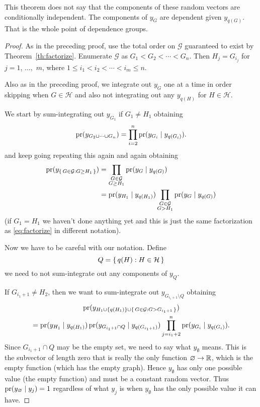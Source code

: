 This theorem does not say that the components of these random vectors are
conditionally independent.  The components of $y_G$ are dependent given
$y_{q(G)}$.  That is the whole point of dependence groups.
\begin{proof}
As in the preceding proof, use the total order on $\mathcal{G}$ guaranteed
to exist by Theorem~\ref{th:factorize}.
Enumerate $\mathcal{G}$ as $G_1 < G_2 < \cdots < G_n$.
Then $H_j = G_{i_j}$ for $j = 1$, $\ldots,$ $m$,
where $1 \le i_1 < i_2 < \cdots < i_m \le n$.

Also as in the preceding proof, we integrate out $y_G$ one at a time
in order skipping when $G \in \mathcal{H}$ and also not integrating out
any $y_{q(H)}$ for $H \in \mathcal{H}$.

We start by sum-integrating out $y_{G_1}$ if $G_1 \neq H_1$ obtaining
$$
   \operatorname{pr}(y_{G_2 \cup \cdots \cup G_n})
   =
   \prod_{i = 2}^n \operatorname{pr}(y_{G_i} \mid y_{q(G_i)}).
$$
and keep going repeating this again and again obtaining
\begin{align*}
   \operatorname{pr}(y_{\{\, G \in \mathcal{G} : G \ge H_1 \,\}})
   & =
   \prod_{\substack{G \in \mathcal{G} \\ G \ge H_1}}
   \operatorname{pr}(y_G \mid y_{q(G)})
   \\
   & =
   \operatorname{pr}(y_{H_1} \mid y_{q(H_1)})
   \prod_{\substack{G \in \mathcal{G} \\ G > H_1}}
   \operatorname{pr}(y_G \mid y_{q(G)})
\end{align*}
(if $G_1 = H_1$ we haven't done anything yet and this is just the same
factorization as \eqref{eq:factorize} in different notation).

Now we have to be careful with our notation.  Define
$$
   Q = \{\,  q(H) : H \in \mathcal{H}  \,\}
$$
we need to not sum-integrate out any components of $y_Q$.

If $G_{i_1 + 1} \neq H_2$, then we want to sum-integrate out
$y_{G_{i_1 + 1} \setminus Q}$ obtaining
\begin{multline*}
   \operatorname{pr}(y_{H_1 \cup \{q(H_1)\} \cup \{\, G \in \mathcal{G} : G > G_{i_1 + 1} \,\}})
   \\
   =
   \operatorname{pr}(y_{H_1} \mid y_{q(H_1)})
   \operatorname{pr}(y_{G_{i_1 + 1} \cap Q} \mid y_{q(G_{i_1 + 1})})
   \prod_{j = i_1 + 2}^n
   \operatorname{pr}(y_{G_i} \mid y_{q(G_i)}).
\end{multline*}
Since $G_{i_1 + 1} \cap Q$ may be the empty set, we need to say what
$y_\emptyset$ means.  This is the subvector of length zero that is really
the only function $\varnothing \to \mathbb{R}$, which is the empty function
(which has the empty graph).  Hence $y_\emptyset$ has only one possible
value (the empty function) and must be a constant random vector.
Thus $\operatorname{pr}(y_\varnothing \mid y_j) = 1$ regardless of what $y_j$ is when
$y_\emptyset$ has the only possible value it can have.


\end{proof}
